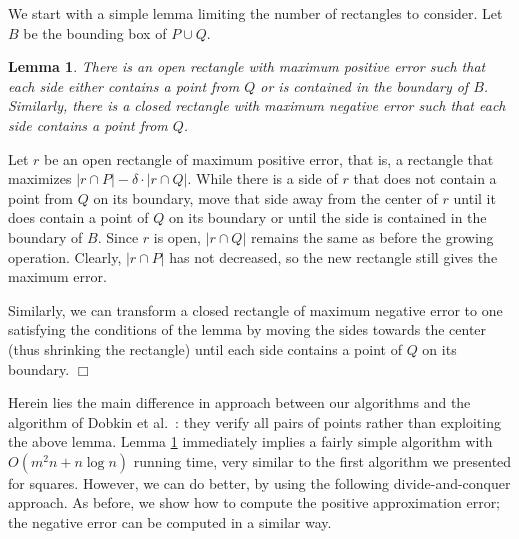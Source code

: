 \documentclass{elsart}
\newtheorem{lemma}[definition]{Lemma}
\newenvironment{proof}{{\bf Proof:} \rm}{\hfill $\Box$ \medskip\\}
\begin{document}
We start with a simple lemma limiting the number of rectangles to
consider. Let $B$ be the bounding box of $P\cup Q$.
\begin{lemma}\label{le:rectangles}
There is an open rectangle with maximum positive error such that
each side either contains a point from $Q$ or is contained
in the boundary of $B$.
Similarly, there is a closed rectangle with maximum negative error such that
each side contains a point from $Q$.
\end{lemma}
\begin{proof}
Let $r$ be an open rectangle of maximum positive error, that is, a
rectangle that maximizes $|r \cap P| - \delta \cdot |r \cap Q|$.
While there is a side of $r$ that does not contain a point from $Q$ on
its boundary, move that side away from the center of $r$ until it does
contain a point of $Q$ on its boundary or until the side is contained
in the boundary of $B$.  Since $r$ is open, $|r \cap Q|$ remains the
same as before the growing operation. Clearly, $|r \cap P|$ has not
decreased, so the new rectangle still gives the maximum error.

Similarly, we can transform a closed rectangle of maximum negative error
to one satisfying the conditions of the lemma by moving the sides
towards the center (thus shrinking the rectangle) until each side
contains a point of $Q$ on its boundary.
\end{proof}

Herein lies the main difference in approach between our algorithms and the
algorithm of Dobkin et al.~\cite{dgm96}: they verify all pairs of points
rather than exploiting the above lemma.
Lemma \ref{le:rectangles}
immediately implies a fairly simple algorithm with $O(m^2n + n\log n)$
running time, very similar to the first algorithm we presented for squares.
However, we can do better, by using the following
divide-and-conquer approach. As before, we show how to compute the
positive approximation error; the negative error can be computed in a
similar way.
\end{document}
